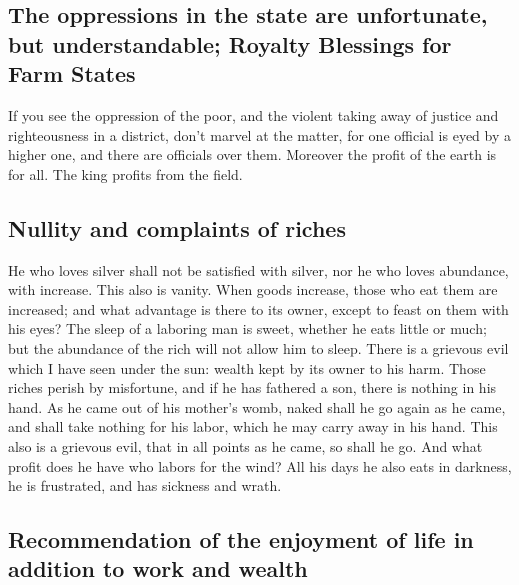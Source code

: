 \begin{paracol}{2}
\begin{otherlanguage}{english}
\hypertarget{the-oppressions-in-the-state-are-unfortunate-but-understandable-royalty-blessings-for-farm-states}{%
\subsection{The oppressions in the state are unfortunate, but
understandable; Royalty Blessings for Farm
States}\label{the-oppressions-in-the-state-are-unfortunate-but-understandable-royalty-blessings-for-farm-states}}

 If you see the oppression of the poor, and the violent
taking away of justice and righteousness in a district, don't marvel at
the matter, for one official is eyed by a higher one, and there are
officials over them.  Moreover the profit of the earth is
for all. The king profits from the field.

\hypertarget{nullity-and-complaints-of-riches}{%
\subsection{Nullity and complaints of
riches}\label{nullity-and-complaints-of-riches}}

 He who loves silver shall not be satisfied with silver,
nor he who loves abundance, with increase. This also is vanity.
 When goods increase, those who eat them are increased;
and what advantage is there to its owner, except to feast on them with
his eyes?  The sleep of a laboring man is sweet, whether
he eats little or much; but the abundance of the rich will not allow him
to sleep.  There is a grievous evil which I have seen
under the sun: wealth kept by its owner to his harm. 
Those riches perish by misfortune, and if he has fathered a son, there
is nothing in his hand.  As he came out of his mother's
womb, naked shall he go again as he came, and shall take nothing for his
labor, which he may carry away in his hand.  This also is
a grievous evil, that in all points as he came, so shall he go. And what
profit does he have who labors for the wind?  All his
days he also eats in darkness, he is frustrated, and has sickness and
wrath.

\hypertarget{recommendation-of-the-enjoyment-of-life-in-addition-to-work-and-wealth}{%
\subsection{Recommendation of the enjoyment of life in addition to work
and
wealth}\label{recommendation-of-the-enjoyment-of-life-in-addition-to-work-and-wealth}}


\end{otherlanguage}
\end{paracol}
